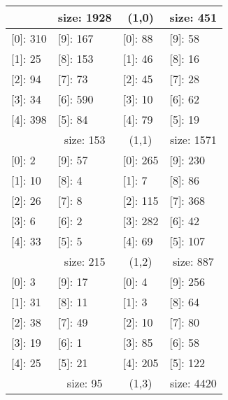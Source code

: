 \documentclass[a4paper,12pt]{report}
\begin{document}
\begin{longtable}[c]{llll}
\rowcolor[HTML]{D9D9D9} 
\multicolumn{1}{c}{\cellcolor[HTML]{D9D9D9}(0,0)} & \multicolumn{1}{c}{\cellcolor[HTML]{D9D9D9}size: 1928} & \multicolumn{1}{c}{\cellcolor[HTML]{D9D9D9}(1,0)} & \multicolumn{1}{c}{\cellcolor[HTML]{D9D9D9}size: 451} \\
\endfirsthead
%
\endhead
%
{[}0{]}: 310 & {[}9{]}: 167 & {[}0{]}: 88 & {[}9{]}: 58 \\
{[}1{]}: 25 & {[}8{]}: 153 & {[}1{]}: 46 & {[}8{]}: 16 \\
{[}2{]}: 94 & {[}7{]}: 73 & {[}2{]}: 45 & {[}7{]}: 28 \\
{[}3{]}: 34 & {[}6{]}: 590 & {[}3{]}: 10 & {[}6{]}: 62 \\
{[}4{]}: 398 & {[}5{]}: 84 & {[}4{]}: 79 & {[}5{]}: 19 \\
\rowcolor[HTML]{D9D9D9} 
\multicolumn{1}{c}{\cellcolor[HTML]{D9D9D9}(0,1)} & \multicolumn{1}{c}{\cellcolor[HTML]{D9D9D9}size: 153} & \multicolumn{1}{c}{\cellcolor[HTML]{D9D9D9}(1,1)} & \multicolumn{1}{c}{\cellcolor[HTML]{D9D9D9}size: 1571} \\
{[}0{]}: 2 & {[}9{]}: 57 & {[}0{]}: 265 & {[}9{]}: 230 \\
{[}1{]}: 10 & {[}8{]}: 4 & {[}1{]}: 7 & {[}8{]}: 86 \\
{[}2{]}: 26 & {[}7{]}: 8 & {[}2{]}: 115 & {[}7{]}: 368 \\
{[}3{]}: 6 & {[}6{]}: 2 & {[}3{]}: 282 & {[}6{]}: 42 \\
{[}4{]}: 33 & {[}5{]}: 5 & {[}4{]}: 69 & {[}5{]}: 107 \\
\rowcolor[HTML]{D9D9D9} 
\multicolumn{1}{c}{\cellcolor[HTML]{D9D9D9}(0,2)} & \multicolumn{1}{c}{\cellcolor[HTML]{D9D9D9}size: 215} & \multicolumn{1}{c}{\cellcolor[HTML]{D9D9D9}(1,2)} & \multicolumn{1}{c}{\cellcolor[HTML]{D9D9D9}size: 887} \\
{[}0{]}: 3 & {[}9{]}: 17 & {[}0{]}: 4 & {[}9{]}: 256 \\
{[}1{]}: 31 & {[}8{]}: 11 & {[}1{]}: 3 & {[}8{]}: 64 \\
{[}2{]}: 38 & {[}7{]}: 49 & {[}2{]}: 10 & {[}7{]}: 80 \\
{[}3{]}: 19 & {[}6{]}: 1 & {[}3{]}: 85 & {[}6{]}: 58 \\
{[}4{]}: 25 & {[}5{]}: 21 & {[}4{]}: 205 & {[}5{]}: 122 \\
\rowcolor[HTML]{D9D9D9} 
\multicolumn{1}{c}{\cellcolor[HTML]{D9D9D9}(0,3)} & \multicolumn{1}{c}{\cellcolor[HTML]{D9D9D9}size: 95} & \multicolumn{1}{c}{\cellcolor[HTML]{D9D9D9}(1,3)} & \multicolumn{1}{c}{\cellcolor[HTML]{D9D9D9}size: 4420} \\

\end{longtable}
\end{document}
